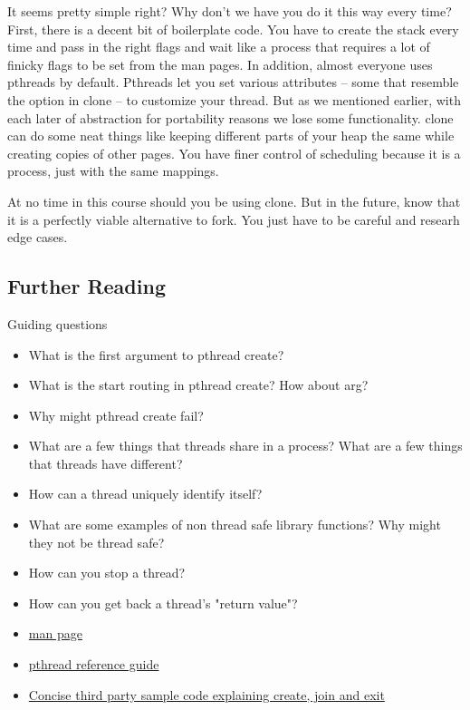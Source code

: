 It seems pretty simple right?
Why don't we have you do it this way every time?
First, there is a decent bit of boilerplate code.
You have to create the stack every time and pass in the right flags and wait like a process that requires a lot of finicky flags to be set from the man pages.
In addition, almost everyone uses pthreads by default.
Pthreads let you set various attributes -- some that resemble the option in clone -- to customize your thread.
But as we mentioned earlier, with each later of abstraction for portability reasons we lose some functionality.
clone can do some neat things like keeping different parts of your heap the same while creating copies of other pages.
You have finer control of scheduling because it is a process, just with the same mappings.

At no time in this course should you be using clone.
But in the future, know that it is a perfectly viable alternative to fork.
You just have to be careful and researh edge cases.

\subsection{Further Reading}

Guiding questions

\begin{itemize}
\item What is the first argument to pthread create?
\item What is the start routing in pthread create? How about arg?
\item Why might pthread create fail?
\item What are a few things that threads share in a process? What are a few things that threads have different?
\item How can a thread uniquely identify itself?
\item What are some examples of non thread safe library functions? Why might they not be thread safe?
\item How can you stop a thread?
\item How can you get back a thread's "return value"?
\end{itemize}

\begin{itemize}
\item \href{http://man7.org/linux/man-pages/man3/pthread_create.3.html}{man page}
\item \href{http://man7.org/linux/man-pages/man7/pthreads.7.html}{pthread reference guide}
\item \href{http://www.thegeekstuff.com/2012/04/terminate-c-thread/}{Concise third party sample code explaining create, join and exit}
\end{itemize}

